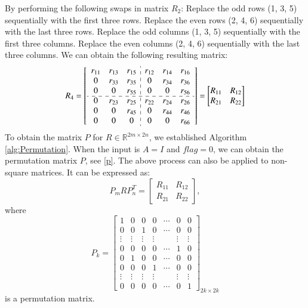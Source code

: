 \documentclass[5p]{elsarticle}
\numberwithin{equation}{section}
\begin{document}
By performing the following swaps in matrix $R_2$: Replace the odd rows (1, 3, 5) sequentially with the first three rows. Replace the even rows (2, 4, 6) sequentially with the last three rows. Replace the odd columns (1, 3, 5) sequentially with the first three columns. Replace the even columns (2, 4, 6) sequentially with the last three columns. We can obtain the following  resulting matrix:
\begin{equation*}
R_4 = \begin{bmatrix}
\begin{array}{ccc:ccc}
 r_{11} & r_{13} & r_{15} & r_{12} & r_{14} & r_{16}\\
 0      & r_{33} & r_{35} & 0      & r_{34} & r_{36}\\
 0      & 0      & r_{55} & 0      & 0      & r_{56}\\
 \cdashline{1-6}
0 & r_{23} & r_{25} & r_{22} & r_{24} & r_{26}\\
 0      & 0 & r_{45} & 0      & r_{44} & r_{46}\\
 0      & 0      & 0 & 0      & 0      & r_{66}\\
\end{array}
\end{bmatrix}=\begin{bmatrix}
    R_{11} & R_{12}\\R_{21} & R_{22}
\end{bmatrix}
\end{equation*}
To obtain the matrix $P$ for $R \in \mathbb{R}^{2m \times 2n}$, we established Algorithm \ref{alg:Permutation}. When the input is $A=I$ and $flag=0$, we can obtain the permutation matrix $P$, see \eqref{p}. The above process can also be applied to non-square matrices. It can be expressed as:
\begin{equation}
    P_{m} R P_{n}^T = \begin{bmatrix} R_{11} & R_{12}\\R_{21}& R_{22}\end{bmatrix},\label{eq:Rn}
\end{equation}
where
\begin{equation}\label{p}
    P_k = \begin{bmatrix} 
            1 & 0 & 0 & 0 & \cdots & 0 & 0\\ 
            0 & 0 & 1 & 0 & \cdots & 0 & 0\\ 
            \vdots & \vdots & \vdots & \vdots &  & \vdots & \vdots\\ 
            0 & 0 & 0 & 0 & \cdots & 1 & 0 \\
            0 & 1 & 0 & 0 & \cdots & 0 & 0\\ 
            0 & 0 & 0 & 1 & \cdots & 0 & 0\\ 
            \vdots & \vdots & \vdots & \vdots &  & \vdots & \vdots\\ 
            0 & 0 & 0 & 0 &\cdots & 0 & 1 
        \end{bmatrix}_{2k \times 2k}
\end{equation}
is a permutation matrix.
\end{document}
